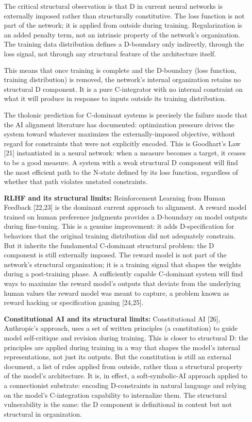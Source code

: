 \documentclass[12pt]{article}
\begin{document}
The critical structural observation is that D in current neural networks
is externally imposed rather than structurally constitutive. The loss
function is not part of the network; it is applied from outside during
training. Regularization is an added penalty term, not an intrinsic
property of the network's organization. The training data distribution
defines a D-boundary only indirectly, through the loss signal, not
through any structural feature of the architecture itself.

This means that once training is complete and the D-boundary (loss
function, training distribution) is removed, the network's internal
organization retains no structural D component. It is a pure
C-integrator with no internal constraint on what it will produce in
response to inputs outside its training distribution.

The tholonic prediction for C-dominant systems is precisely the failure
mode that the AI alignment literature has documented: optimization
pressure drives the system toward whatever maximizes the
externally-imposed objective, without regard for constraints that were
not explicitly encoded. This is Goodhart's Law {[}21{]} instantiated in
a neural network: when a measure becomes a target, it ceases to be a
good measure. A system with a weak structural D component will find the
most efficient path to the N-state defined by its loss function,
regardless of whether that path violates unstated constraints.

\textbf{RLHF and its structural limits:} Reinforcement Learning from
Human Feedback {[}22,23{]} is the dominant current approach to
alignment. A reward model trained on human preference judgments provides
a D-boundary on model outputs during fine-tuning. This is a genuine
improvement: it adds D-specification for behaviors that the original
training distribution did not adequately constrain. But it inherits the
fundamental C-dominant structural problem: the D component is still
externally imposed. The reward model is not part of the network's
structural organization; it is a training signal that shapes the weights
during a post-training phase. A sufficiently capable C-dominant system
will find ways to maximize the reward model's outputs that deviate from
the underlying human values the reward model was meant to capture, a
problem known as reward hacking or specification gaming {[}24,25{]}.

\textbf{Constitutional AI and its structural limits:} Constitutional AI
{[}26{]}, Anthropic's approach, uses a set of written principles (a
constitution) to guide model self-critique and revision during training.
This is closer to structural D: the principles are applied during
training in a way that shapes the model's internal representations, not
just its outputs. But the constitution is still an external document, a
list of rules applied from outside, rather than a structural property of
the model's architecture. It is, in effect, a soft-symbolic-AI approach
applied to a connectionist substrate: encoding D-constraints in natural
language and relying on the model's C-integration capability to
internalize them. The structural vulnerability is the same: the D
component is definitional in content but not structural in organization.
\end{document}
